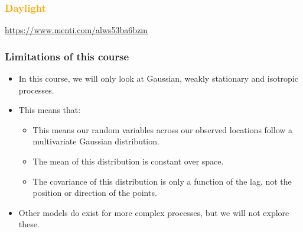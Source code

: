 \documentclass[parskip,12pt]{beamer}
\begin{document}
\begin{frame}
\frametitle{\textcolor{orange}{Daylight}}
\vspace{-3mm}
\url{https://www.menti.com/alws53ba6bzm}
\end{frame}

\begin{frame}
\frametitle{Limitations of this course}
 \begin{itemize}
\item In this course, we will only look at Gaussian, weakly stationary and isotropic processes.
\vspace{3mm}
\item This means that:
\vspace{2mm}
\begin{itemize}
\item This means our random variables across our observed locations follow a multivariate Gaussian distribution.
\vspace{2mm}
\item The mean of this distribution is constant over space.
\vspace{2mm}
\item The covariance of this distribution is only a function of the lag, not the position or direction of the points.
\end{itemize}
\vspace{2mm}
\item Other models do exist for more complex processes, but we will not explore these.
\end{itemize}
\end{frame}
  
\end{document}
